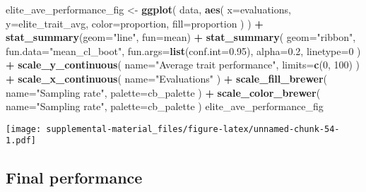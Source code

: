 \documentclass[]{book}
\newenvironment{Shaded}{\begin{snugshade}}{\end{snugshade}}
\newcommand{\DataTypeTok}[1]{\textcolor[rgb]{0.13,0.29,0.53}{#1}}
\newcommand{\DecValTok}[1]{\textcolor[rgb]{0.00,0.00,0.81}{#1}}
\newcommand{\FloatTok}[1]{\textcolor[rgb]{0.00,0.00,0.81}{#1}}
\newcommand{\KeywordTok}[1]{\textcolor[rgb]{0.13,0.29,0.53}{\textbf{#1}}}
\newcommand{\NormalTok}[1]{#1}
\newcommand{\OperatorTok}[1]{\textcolor[rgb]{0.81,0.36,0.00}{\textbf{#1}}}
\newcommand{\StringTok}[1]{\textcolor[rgb]{0.31,0.60,0.02}{#1}}
\begin{document}
\begin{Shaded}
\begin{Highlighting}[]
\NormalTok{elite_ave_performance_fig <-}
\StringTok{  }\KeywordTok{ggplot}\NormalTok{(}
\NormalTok{    data,}
    \KeywordTok{aes}\NormalTok{(}
      \DataTypeTok{x=}\NormalTok{evaluations,}
      \DataTypeTok{y=}\NormalTok{elite_trait_avg,}
      \DataTypeTok{color=}\NormalTok{proportion,}
      \DataTypeTok{fill=}\NormalTok{proportion}
\NormalTok{    )}
\NormalTok{  ) }\OperatorTok{+}
\StringTok{  }\KeywordTok{stat_summary}\NormalTok{(}\DataTypeTok{geom=}\StringTok{"line"}\NormalTok{, }\DataTypeTok{fun=}\NormalTok{mean) }\OperatorTok{+}
\StringTok{  }\KeywordTok{stat_summary}\NormalTok{(}
    \DataTypeTok{geom=}\StringTok{"ribbon"}\NormalTok{,}
    \DataTypeTok{fun.data=}\StringTok{"mean_cl_boot"}\NormalTok{,}
    \DataTypeTok{fun.args=}\KeywordTok{list}\NormalTok{(}\DataTypeTok{conf.int=}\FloatTok{0.95}\NormalTok{),}
    \DataTypeTok{alpha=}\FloatTok{0.2}\NormalTok{,}
    \DataTypeTok{linetype=}\DecValTok{0}
\NormalTok{  ) }\OperatorTok{+}
\StringTok{  }\KeywordTok{scale_y_continuous}\NormalTok{(}
    \DataTypeTok{name=}\StringTok{"Average trait performance"}\NormalTok{,}
    \DataTypeTok{limits=}\KeywordTok{c}\NormalTok{(}\DecValTok{0}\NormalTok{, }\DecValTok{100}\NormalTok{)}
\NormalTok{  ) }\OperatorTok{+}
\StringTok{  }\KeywordTok{scale_x_continuous}\NormalTok{(}
    \DataTypeTok{name=}\StringTok{"Evaluations"}
\NormalTok{  ) }\OperatorTok{+}
\StringTok{  }\KeywordTok{scale_fill_brewer}\NormalTok{(}
    \DataTypeTok{name=}\StringTok{"Sampling rate"}\NormalTok{,}
    \DataTypeTok{palette=}\NormalTok{cb_palette}
\NormalTok{  ) }\OperatorTok{+}
\StringTok{  }\KeywordTok{scale_color_brewer}\NormalTok{(}
    \DataTypeTok{name=}\StringTok{"Sampling rate"}\NormalTok{,}
    \DataTypeTok{palette=}\NormalTok{cb_palette}
\NormalTok{  )}
\NormalTok{elite_ave_performance_fig}
\end{Highlighting}
\end{Shaded}

\texttt{[image: supplemental-material\_files/figure-latex/unnamed-chunk-54-1.pdf]}

\hypertarget{final-performance-4}{%
\subsection{Final performance}\label{final-performance-4}}
\end{document}

